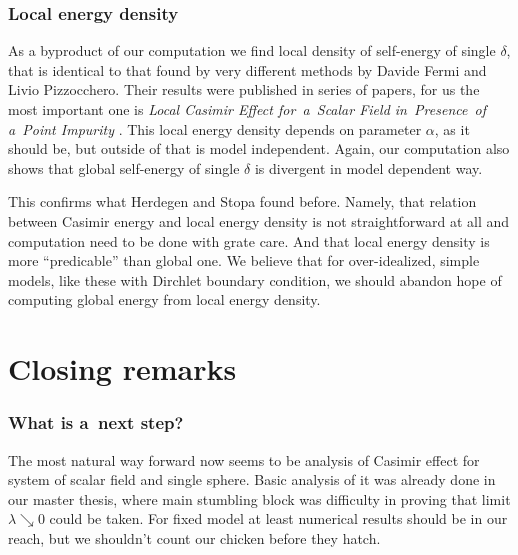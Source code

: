 \documentclass[10pt,t]{beamer}
\begin{document}
\begin{frame}
  \frametitle{Local energy density}


  As a byproduct of our computation we find
  local density of self-energy of single $\delta$, that is identical to that
  found by very different methods by Davide Fermi and Livio Pizzocchero.
  Their
  results were published in series of papers, for us the most important one
  is \textit{Local Casimir Effect for~a~Scalar Field in~Presence~of a~Point
    Impurity}
  \parencite{Fermi-Pizzocchero-Local-Casimir-Effect-for-a-Scalar-ETC-2018}.
  This local energy density depends on parameter $\alpha$, as it should be,
  but outside of that is model independent. Again, our computation also
  shows that \alert{global} self-energy of single $\delta$ is divergent in model
  dependent way.

  This confirms what Herdegen and Stopa found before. Namely, that relation
  between Casimir energy and local energy density is not straightforward at
  all and computation need to be done with grate care. And that local energy
  density is more ``predicable'' than global one. We believe that for
  over-idealized, simple models, like these with Dirchlet boundary
  condition, we should abandon hope of computing global energy from local
  energy density.

\end{frame}










\section{Closing remarks}


\begin{frame}
  \frametitle{What is a~next step?}


  The most natural way forward now seems to be analysis of Casimir effect
  for system of scalar field and single sphere. Basic analysis of it was
  already done in our master thesis, where main stumbling block was
  difficulty in proving
  that limit $\lambda \searrow 0$ could be taken. For fixed model at least
  numerical results should be in our reach, but we shouldn't count our
  chicken before they hatch.

\end{frame}
\end{document}
